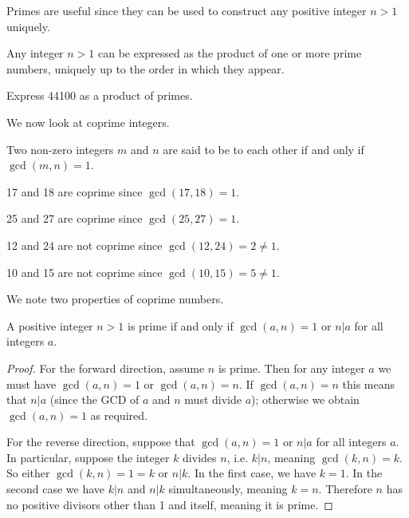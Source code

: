 Primes are useful since they can be used to construct any positive integer $n>1$ uniquely.
\begin{theorem}\label{thrm-fundamental-theorem-of-arithmetic}
    Any integer $n > 1$ can be expressed as the product of one or more prime numbers, uniquely up to the order in which they appear.
\end{theorem}

\begin{exercise}
    Express 44100 as a product of primes.
\end{exercise}

We now look at coprime integers.
\begin{definition}
    Two non-zero integers $m$ and $n$ are said to be  to each other if and only if $\gcd(m, n) = 1$.
\end{definition}

\begin{example}
    17 and 18 are coprime since $\gcd(17, 18) = 1$.
\end{example}

\begin{example}
    25 and 27 are coprime since $\gcd(25, 27) = 1$.
\end{example}

\begin{example}
    12 and 24 are not coprime since $\gcd(12, 24) = 2 \neq 1$.
\end{example}

\begin{example}
    10 and 15 are not coprime since $\gcd(10, 15) = 5 \neq 1$.
\end{example}

We note two properties of coprime numbers.
\begin{proposition}\label{prop-prime-is-coprime-or-divisor}
    A positive integer $n > 1$ is prime if and only if $\gcd(a,n) = 1$ or $n \vert a$ for all integers $a$.
\end{proposition}
\begin{proof}
    For the forward direction, assume $n$ is prime. Then for any integer $a$ we must have $\gcd(a, n) = 1$ or $\gcd(a, n) = n$. If $\gcd(a,n) = n$ this means that $n \vert a$ (since the GCD of $a$ and $n$ must divide $a$); otherwise we obtain $\gcd(a,n) = 1$ as required.

    For the reverse direction, suppose that $\gcd(a,n) = 1$ or $n \vert a$ for all integers $a$. In particular, suppose the integer $k$ divides $n$, i.e. $k \vert n$, meaning $\gcd(k, n) = k$. So either $\gcd(k,n) = 1 = k$ or $n \vert k$. In the first case, we have $k = 1$. In the second case we have $k \vert n$ and $n \vert k$ simultaneously, meaning $k = n$. Therefore $n$ has no positive divisors other than 1 and itself, meaning it is prime.
\end{proof}

